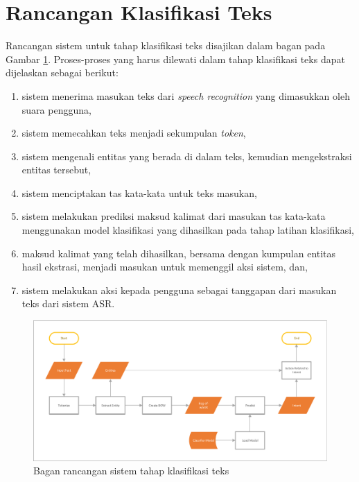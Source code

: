 \section{Rancangan Klasifikasi Teks}

Rancangan sistem untuk tahap klasifikasi teks disajikan dalam bagan pada Gambar \ref{fig:design_classification}. Proses-proses yang harus dilewati dalam tahap klasifikasi teks dapat dijelaskan sebagai berikut:

\begin{enumerate}
	\item sistem menerima masukan teks dari \textit{speech recognition} yang dimasukkan oleh suara pengguna,
	\item sistem memecahkan teks menjadi sekumpulan \textit{token},
	\item sistem mengenali entitas yang berada di dalam teks, kemudian mengekstraksi entitas tersebut,
	\item sistem menciptakan tas kata-kata untuk teks masukan,
	\item sistem melakukan prediksi maksud kalimat dari masukan tas kata-kata menggunakan model klasifikasi yang dihasilkan pada tahap latihan klasifikasi,
	\item maksud kalimat yang telah dihasilkan, bersama dengan kumpulan entitas hasil ekstrasi, menjadi masukan untuk memenggil aksi sistem, dan,
	\item sistem melakukan aksi kepada pengguna sebagai tanggapan dari masukan teks dari sistem ASR.
\end{enumerate}

\begin{figure}[H]
	\centering
	\includegraphics[width=\textwidth, trim=2 2 2 2, clip]{resources/4-design_classification.pdf}
	\caption{Bagan rancangan sistem tahap klasifikasi teks}
	\label{fig:design_classification}
\end{figure}

